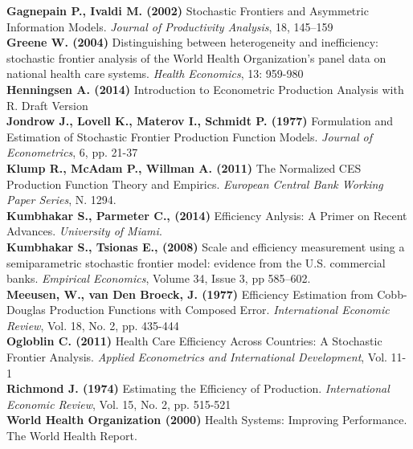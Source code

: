 \documentclass[12pt,a4paper]{article}\usepackage[]{graphicx}\usepackage[]{color}
\begin{document}
\textbf{Gagnepain P., Ivaldi M. (2002)} Stochastic Frontiers and Asymmetric Information Models. \textit{Journal of Productivity Analysis}, 18, 145–159 \\

\textbf{Greene W. (2004)} Distinguishing between heterogeneity and inefficiency: stochastic frontier analysis of the World Health Organization's panel data on national health care systems. \textit{Health Economics}, 13: 959-980 \\

\textbf{Henningsen A. (2014)} Introduction to Econometric Production Analysis with R. Draft Version \\

\textbf{Jondrow J., Lovell K., Materov I., Schmidt P. (1977)} Formulation and Estimation of Stochastic Frontier Production Function Models. \textit{Journal of Econometrics}, 6, pp. 21-37 \\

\textbf{Klump R., McAdam P., Willman A. (2011)} The Normalized CES Production Function Theory and Empirics. \textit{European Central Bank Working Paper Series}, N. 1294. \\

\textbf{Kumbhakar S., Parmeter C., (2014)} Efficiency Anlysis: A Primer on Recent Advances. \textit{University of Miami}. \\

\textbf{Kumbhakar S., Tsionas E., (2008)} Scale and efficiency measurement using a semiparametric stochastic frontier model: evidence from the U.S. commercial banks. \textit{Empirical Economics}, Volume 34, Issue 3, pp 585–602. \\

\textbf{Meeusen, W., van Den Broeck, J. (1977)} Efficiency Estimation from Cobb-Douglas Production Functions with Composed Error. \textit{International Economic Review}, Vol. 18, No. 2, pp. 435-444 \\

\textbf{Ogloblin C. (2011)} Health Care Efficiency Across Countries: A Stochastic Frontier Analysis. \textit{Applied Econometrics and International Development}, Vol. 11-1 \\

\textbf{Richmond J. (1974)} Estimating the Efficiency of Production. \textit{International Economic Review}, Vol. 15, No. 2, pp. 515-521 \\

\textbf{World Health Organization (2000)} Health Systems: Improving Performance. The World Health Report.
\end{document}

